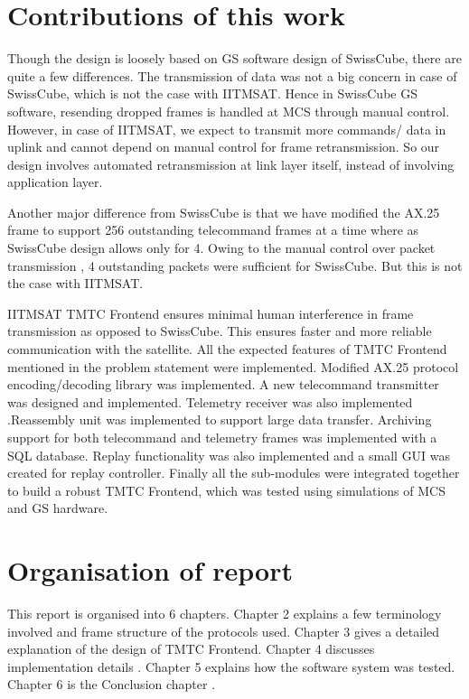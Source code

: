 \documentclass[BTech]{iitmdiss}
\begin{document}
\section{Contributions of this work}
Though the design is loosely based on GS software design of SwissCube, there are quite a few differences. The transmission of data was not a big concern in case of SwissCube, which is not the case with IITMSAT. Hence in SwissCube GS software, resending dropped frames is handled at MCS through manual control. However, in case of IITMSAT, we expect to transmit more commands/ data in uplink and cannot depend on manual control for frame retransmission. So our design involves automated retransmission at link layer itself, instead of involving application layer. 
\par Another major difference from SwissCube is that we have modified the AX.25 frame to support 256 outstanding telecommand frames at a time where as SwissCube design allows only for 4. Owing to the manual control over packet transmission , 4 outstanding packets were sufficient for SwissCube. But this is not the case with IITMSAT. 
\par IITMSAT TMTC Frontend ensures minimal human interference in frame transmission as opposed to SwissCube. This ensures faster and more reliable communication with the satellite. All the expected features of TMTC Frontend mentioned in the problem statement were implemented. Modified AX.25 protocol encoding/decoding library was implemented. A new telecommand transmitter was designed and implemented. Telemetry receiver was also implemented .Reassembly unit was implemented to support large data transfer. Archiving support for both telecommand and telemetry frames was implemented with a SQL database. Replay functionality was also implemented and a small GUI was created for replay controller.  Finally all the sub-modules were integrated together to build a robust TMTC Frontend, which was tested using simulations of MCS and GS hardware. 
 
 \section{Organisation of report}
 
This report is organised into 6 chapters. Chapter 2 explains a few terminology involved and frame structure of the protocols used. Chapter 3 gives a detailed explanation of the design of TMTC Frontend. Chapter 4 discusses  implementation details . Chapter 5 explains how the software system was tested. Chapter 6 is the Conclusion chapter . 
\end{document}
